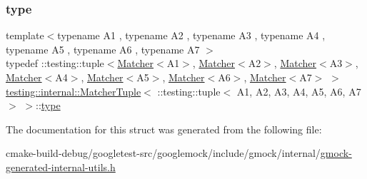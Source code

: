 \subsubsection{\texorpdfstring{type}{type}}
{\footnotesize\ttfamily template$<$typename A1 , typename A2 , typename A3 , typename A4 , typename A5 , typename A6 , typename A7 $>$ \\
typedef \+::testing\+::tuple$<$\mbox{\hyperlink{classtesting_1_1Matcher}{Matcher}}$<$A1$>$, \mbox{\hyperlink{classtesting_1_1Matcher}{Matcher}}$<$A2$>$, \mbox{\hyperlink{classtesting_1_1Matcher}{Matcher}}$<$A3$>$, \mbox{\hyperlink{classtesting_1_1Matcher}{Matcher}}$<$A4$>$, \mbox{\hyperlink{classtesting_1_1Matcher}{Matcher}}$<$A5$>$, \mbox{\hyperlink{classtesting_1_1Matcher}{Matcher}}$<$A6$>$, \mbox{\hyperlink{classtesting_1_1Matcher}{Matcher}}$<$A7$>$ $>$ \mbox{\hyperlink{structtesting_1_1internal_1_1MatcherTuple}{testing\+::internal\+::\+Matcher\+Tuple}}$<$ \+::testing\+::tuple$<$ A1, A2, A3, A4, A5, A6, A7 $>$ $>$\+::\mbox{\hyperlink{structtesting_1_1internal_1_1MatcherTuple_3_01_1_1testing_1_1tuple_3_01A1_00_01A2_00_01A3_00_01A63c742e825c64dbe2671b0a407b3db47_a733b8ef9996b7f465e9018393bec5cc4}{type}}}



The documentation for this struct was generated from the following file\+:\begin{DoxyCompactItemize}
\item 
cmake-\/build-\/debug/googletest-\/src/googlemock/include/gmock/internal/\mbox{\hyperlink{gmock-generated-internal-utils_8h}{gmock-\/generated-\/internal-\/utils.\+h}}\end{DoxyCompactItemize}
